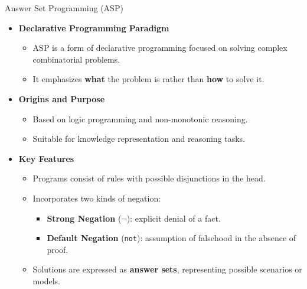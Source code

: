 \begin{frame}{Answer Set Programming (ASP)}
    \begin{itemize}
        \item \textbf{Declarative Programming Paradigm}
              \begin{itemize}
                  \item ASP is a form of declarative programming focused on solving complex combinatorial problems.
                  \item It emphasizes \textbf{what} the problem is rather than \textbf{how} to solve it.
              \end{itemize}
        \item \textbf{Origins and Purpose}
              \begin{itemize}
                  \item Based on logic programming and non-monotonic reasoning.
                  \item Suitable for knowledge representation and reasoning tasks.
              \end{itemize}
        \item \textbf{Key Features}
              \begin{itemize}
                  \item Programs consist of rules with possible disjunctions in the head.
                  \item Incorporates two kinds of negation:
                        \begin{itemize}
                            \item \textbf{Strong Negation} ($\neg$): explicit denial of a fact.
                            \item \textbf{Default Negation} (\texttt{not}): assumption of falsehood in the absence of proof.
                        \end{itemize}
                  \item Solutions are expressed as \textbf{answer sets}, representing possible scenarios or models.
              \end{itemize}
    \end{itemize}
\end{frame}


